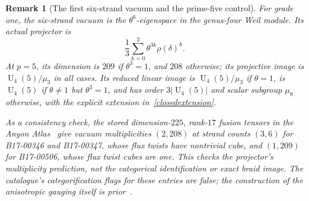 \documentclass[11pt]{amsart}
\newtheorem{remark}[theorem]{Remark}
\newcommand{\U}{\operatorname{U}}
\begin{document}
\begin{remark}[The first six-strand vacuum and the prime-five control]
For grade one, the six-strand vacuum is the
$\theta^6$-eigenspace in the genus-four Weil module. Its actual
projector is
\[
\frac13\sum_{k=0}^2\theta^{3k}\rho(\delta)^k.
\]
At $p=5$, its dimension is $209$ if $\theta^3=1$, and $208$
otherwise; its projective image is $\U_4(5)/\mu_3$ in all cases.
Its reduced linear image is $\U_4(5)/\mu_3$ if $\theta=1$,
is $\U_4(5)$ if $\theta\ne1$ but $\theta^3=1$, and has order
$3|\U_4(5)|$ and scalar subgroup $\mu_9$ otherwise, with the
explicit extension in~\eqref{closedextension}.

As a consistency check, the stored dimension-$225$, rank-$17$
fusion tensors in the Anyon Atlas~\cite{Atlas} give vacuum multiplicities
$(2,208)$ at strand counts $(3,6)$ for B17-00346 and B17-00347,
whose flux twists have nontrivial cube, and $(1,209)$ for B17-00506,
whose flux twist cubes are one. This checks the projector's multiplicity
prediction, not the categorical identification or exact braid image.
The catalogue's categorification flags for these entries are false;
the construction of the anisotropic gauging itself is prior~\cite{GPR}.
\end{remark}
\end{document}
